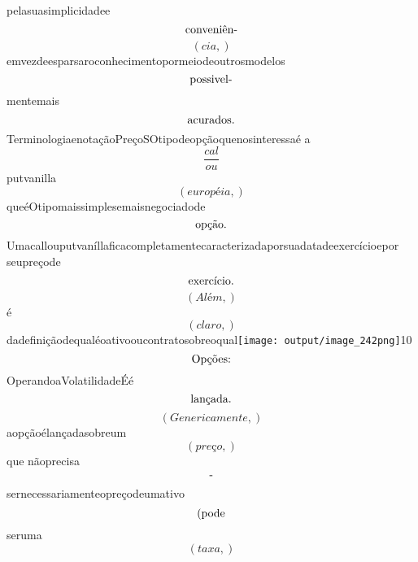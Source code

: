 \documentclass{article}
\begin{document}
\begin{equation}
\end{equation}pelasuasimplicidadee\begin{equation}
$conveniên-$
\end{equation}\begin{equation}
\left( cia,\right)
\end{equation}emvezdeesparsaroconhecimentopormeiodeoutrosmodelos\begin{equation}
$possivel-$
\end{equation}mentemais\begin{equation}
$acurados.$
\end{equation}TerminologiaenotaçãoPreçoSOtipodeopçãoquenosinteressaé a\begin{equation}
\frac{cal}{ou}
\end{equation}putvanilla\begin{equation}
\left( européia,\right)
\end{equation}queéOtipomaissimplesemaisnegociadode\begin{equation}
$opção.$
\end{equation}Umacallouputvaníllaficacompletamentecaracterizadaporsuadatadeexercícioepor seupreçode\begin{equation}
$exercício.$
\end{equation}\begin{equation}
\left( Além,\right)
\end{equation}é\begin{equation}
\left( claro,\right)
\end{equation}dadefiniçãodequaléoativooucontratosobreoqual\texttt{[image: output/image\_242png]}10\begin{equation}
$Opções:$
\end{equation}OperandoaVolatilidadeÉé\begin{equation}
$lançada.$
\end{equation}\begin{equation}
\left( Genericamente,\right)
\end{equation}aopçãoélançadasobreum\begin{equation}
\left( preço,\right)
\end{equation}que nãoprecisa\begin{equation}
$-$
\end{equation}sernecessariamenteopreçodeumativo\begin{equation}
$(pode$
\end{equation}seruma\begin{equation}
\left( taxa,\right)

\end{equation}
\end{document}
